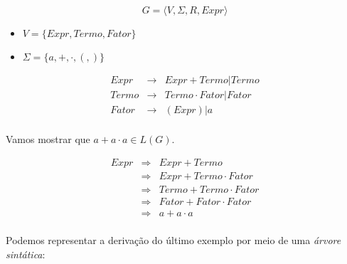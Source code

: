 \begin{example}
  \begin{displaymath}
    G = \langle V, \Sigma, R, Expr \rangle
  \end{displaymath}
  \begin{itemize}
  \item $V = \{Expr, Termo, Fator\}$
  \item $\Sigma = \{a, +, \cdot, (,)\}$
  \end{itemize}

  
  \begin{eqnarray*}
    Expr &\to& Expr  +  Termo |  Termo \\
    Termo &\to& Termo \cdot Fator |  Fator \\
    Fator &\to& ( Expr ) | a \\
  \end{eqnarray*}

Vamos mostrar que $a + a \cdot a \in L(G)$.

\begin{eqnarray*}
  Expr  & \Rightarrow &  Expr  +  Termo  \\
  & \Rightarrow &  Expr  +  Termo  \cdot  Fator \\
  & \Rightarrow &  Termo  +  Termo  \cdot  Fator \\
  & \Rightarrow &  Fator  +  Fator  \cdot  Fator \\
  & \Rightarrow & a + a \cdot a\\
\end{eqnarray*}
\end{example}

Podemos representar a derivação do último exemplo por meio de uma {\em árvore sintática}:

\begin{center}
\end{center}


